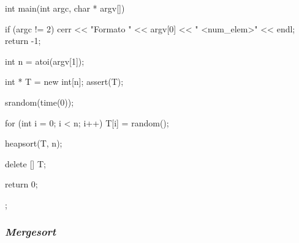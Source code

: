 \documentclass[12pt,spanish]{article}
\begin{document}
\begin{multicols}{2}
\begin{tcblisting}
int main(int argc, char * argv[]){

  if (argc != 2){
      cerr << "Formato " << argv[0] << " <num_elem>" << endl;
      return -1;
    }

  int n = atoi(argv[1]);

  int * T = new int[n];
  assert(T);

  srandom(time(0));

  for (int i = 0; i < n; i++)
      T[i] = random();

  heapsort(T, n);

  delete [] T;

  return 0;
};
\end{tcblisting}
\end{multicols}
\newpage
\subsubsection{\textit{Mergesort}}
\end{document}
